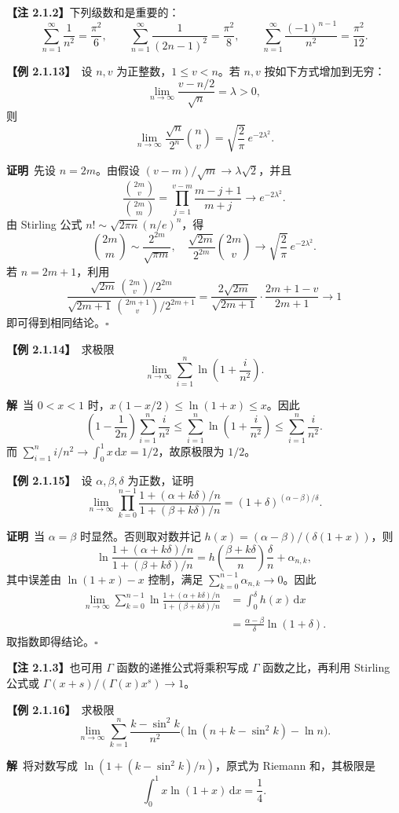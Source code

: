 \documentclass[UTF8,a4paper,11pt]{ctexart}
\newcommand{\ex}[1]{\par\medskip\noindent\textbf{【例 #1】}\ }
\newcommand{\pf}{\par\noindent\textbf{证明}\ }
\newcommand{\sol}{\par\noindent\textbf{解}\ }
\begin{document}
\noindent\textbf{【注 2.1.2】}下列级数和是重要的：
\[
\sum_{n=1}^{\infty}\frac1{n^2}=\frac{\pi^2}6,\qquad
\sum_{n=1}^{\infty}\frac1{(2n-1)^2}=\frac{\pi^2}8,\qquad
\sum_{n=1}^{\infty}\frac{(-1)^{n-1}}{n^2}=\frac{\pi^2}{12}.
\]

\ex{2.1.13}设 $n,v$ 为正整数，$1\le v<n$。若 $n,v$ 按如下方式增加到无穷：
\[
\lim_{n\to\infty}\frac{v-n/2}{\sqrt n}=\lambda>0,
\]
则
\[
\lim_{n\to\infty}\frac{\sqrt n}{2^n}\binom nv=\sqrt{\frac2\pi}\,e^{-2\lambda^2}.
\]
\pf 先设 $n=2m$。由假设 $(v-m)/\sqrt m\to\lambda\sqrt2$，并且
\[
\frac{\binom{2m}{v}}{\binom{2m}{m}}
=\prod_{j=1}^{v-m}\frac{m-j+1}{m+j}\longrightarrow e^{-2\lambda^2}.
\]
由 Stirling 公式 $n!\sim\sqrt{2\pi n}(n/e)^n$，得
\[
\binom{2m}{m}\sim\frac{2^{2m}}{\sqrt{\pi m}},
\quad
\frac{\sqrt{2m}}{2^{2m}}\binom{2m}{v}
\longrightarrow\sqrt{\frac2\pi}\,e^{-2\lambda^2}.
\]
若 $n=2m+1$，利用
\[
\frac{\sqrt{2m}\,\binom{2m}{v}/2^{2m}}{\sqrt{2m+1}\,\binom{2m+1}{v}/2^{2m+1}}
=\frac{2\sqrt{2m}}{\sqrt{2m+1}}\cdot\frac{2m+1-v}{2m+1}\longrightarrow1
\]
即可得到相同结论。\hfill$\square$

\ex{2.1.14}求极限
\[
\lim_{n\to\infty}\sum_{i=1}^{n}\ln\!\left(1+\frac{i}{n^2}\right).
\]
\sol 当 $0<x<1$ 时，$x(1-x/2)\le\ln(1+x)\le x$。因此
\[
\left(1-\frac1{2n}\right)\sum_{i=1}^{n}\frac{i}{n^2}
\le\sum_{i=1}^{n}\ln\!\left(1+\frac{i}{n^2}\right)
\le\sum_{i=1}^{n}\frac{i}{n^2}.
\]
而 $\sum_{i=1}^{n}i/n^2\to\int_0^1x\,\mathrm dx=1/2$，故原极限为 $1/2$。

\ex{2.1.15}设 $\alpha,\beta,\delta$ 为正数，证明
\[
\lim_{n\to\infty}\prod_{k=0}^{n-1}
\frac{1+(\alpha+k\delta)/n}{1+(\beta+k\delta)/n}
=(1+\delta)^{(\alpha-\beta)/\delta}.
\]
\pf 当 $\alpha=\beta$ 时显然。否则取对数并记 $h(x)=(\alpha-\beta)/(\delta(1+x))$，则
\[
\ln\frac{1+(\alpha+k\delta)/n}{1+(\beta+k\delta)/n}
=h\!\left(\frac{\beta+k\delta}{n}\right)\frac\delta n+\alpha_{n,k},
\]
其中误差由 $\ln(1+x)-x$ 控制，满足 $\sum_{k=0}^{n-1}\alpha_{n,k}\to0$。因此
\begin{align*}
\lim_{n\to\infty}\sum_{k=0}^{n-1}
\ln\frac{1+(\alpha+k\delta)/n}{1+(\beta+k\delta)/n}
&=\int_0^\delta h(x)\,\mathrm dx\\
&=\frac{\alpha-\beta}{\delta}\ln(1+\delta).
\end{align*}
取指数即得结论。\hfill$\square$

\noindent\textbf{【注 2.1.3】}也可用 $\Gamma$ 函数的递推公式将乘积写成 $\Gamma$ 函数之比，再利用 Stirling 公式或 $\Gamma(x+s)/(\Gamma(x)x^s)\to1$。

\ex{2.1.16}求极限
\[
\lim_{n\to\infty}\sum_{k=1}^{n}\frac{k-\sin^2k}{n^2}
\bigl(\ln(n+k-\sin^2k)-\ln n\bigr).
\]
\sol 将对数写成 $\ln(1+(k-\sin^2k)/n)$，原式为 Riemann 和，其极限是
\[
\int_0^1x\ln(1+x)\,\mathrm dx=\frac14.
\]
\end{document}
